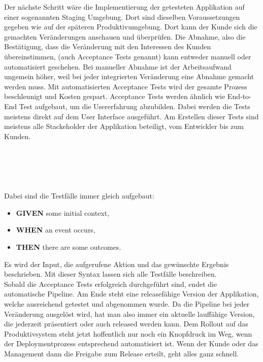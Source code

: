  Der nächste Schritt wäre die Implementierung der getesteten Applikation auf einer sogenannten Staging Umgebung. Dort sind dieselben Voraussetzungen gegeben wie auf der späteren Produktivumgebung.\autocite[Vgl.][S.283]{Farley.2010} Dort kann der Kunde sich die gemachten Veränderungen anschauen und überprüfen. Die Abnahme, also die Bestätigung, dass die Veränderung mit den Interessen des Kunden übereinstimmen, (auch Acceptance Tests genannt) kann entweder manuell oder automatisiert geschehen. Bei manueller Abnahme ist der Arbeitsaufwand ungemein höher, weil bei jeder integrierten Veränderung eine Abnahme gemacht werden muss. Mit automatisierten Acceptance Tests wird der gesamte Prozess beschleunigt und Kosten gespart.\autocite[Vgl.][S.310]{Farley.2010} Acceptance Tests werden ähnlich wie End-to-End Test aufgebaut, um die Usererfahrung abzubilden. Dabei werden die Tests meistens direkt auf dem User Interface ausgeführt. Am Erstellen dieser Tests sind meistens alle Stackeholder der Applikation beteiligt, vom Entwickler bis zum Kunden.\autocite[Vgl.][S.312]{Farley.2010}\\ \\ \\ \\ \\ \\Dabei sind die Testfälle immer gleich aufgebaut\autocite[Vgl.][S.312]{Farley.2010}:
 \begin{itemize}
 	\item\textbf{GIVEN} some initial context,
 	\item\textbf{WHEN} an event occurs,
 	\item\textbf{THEN} there are some outcomes.
 \end{itemize}
Es wird der Input, die aufgerufene Aktion und das gewünschte Ergebnis beschrieben. Mit dieser Syntax lassen sich alle Testfälle beschreiben.\autocite[Vgl.][S.312]{Farley.2010}\\
Sobald die Acceptance Tests erfolgreich durchgeführt sind, endet die automatische Pipeline. Am Ende steht eine releasefähige Version der Applikation, welche ausreichend getestet und abgenommen wurde. Da die Pipeline bei jeder Veränderung ausgelöst wird, hat man also immer ein aktuelle lauffähige Version, die jederzeit präsentiert oder auch released werden kann. Dem Rollout auf das Produktivsystem steht jetzt hoffentlich nur noch ein Knopfdruck im Weg, wenn der Deploymentprozess entsprechend automatisiert ist. Wenn der Kunde oder das Management dann die Freigabe zum Release erteilt, geht alles ganz schnell.\autocite[Vgl.][S.289]{Farley.2010}
